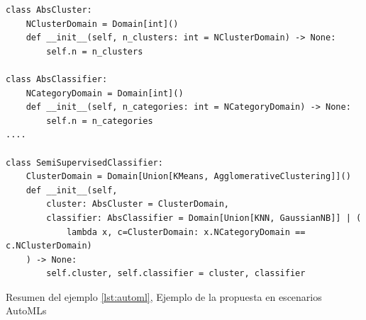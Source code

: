 \begin{listing}[!ht]
    \begin{verbatim}
class AbsCluster:
    NClusterDomain = Domain[int]()
    def __init__(self, n_clusters: int = NClusterDomain) -> None:
        self.n = n_clusters

class AbsClassifier:
    NCategoryDomain = Domain[int]()
    def __init__(self, n_categories: int = NCategoryDomain) -> None:
        self.n = n_categories
....

class SemiSupervisedClassifier:
    ClusterDomain = Domain[Union[KMeans, AgglomerativeClustering]]()
    def __init__(self, 
        cluster: AbsCluster = ClusterDomain,
        classifier: AbsClassifier = Domain[Union[KNN, GaussianNB]] | (
            lambda x, c=ClusterDomain: x.NCategoryDomain == c.NClusterDomain)
    ) -> None:
        self.cluster, self.classifier = cluster, classifier
    \end{verbatim}
    \caption{Resumen del ejemplo \ref{lst:automl}, Ejemplo de la propuesta en escenarios AutoMLs}
    \label{lst:simleautoml}
\end{listing}